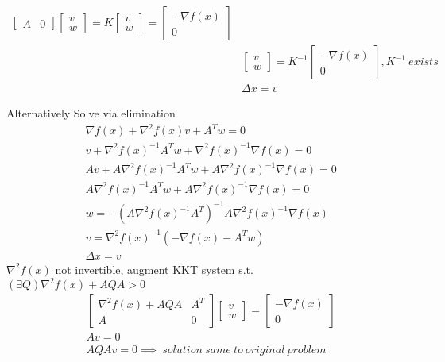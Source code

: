 \message{ !name(notebook.tex)}\documentclass[8pt]{report}
\begin{document}
\begin{multicols*}{2}
\begin{align*}
\begin{bmatrix}
        A & 0 
      \end{bmatrix}
      \begin{bmatrix}
        v\\ w
      \end{bmatrix}=
            K
      \begin{bmatrix}
        v\\ w
      \end{bmatrix} =
    \begin{bmatrix}
        -\nabla f(x)\\
        0
      \end{bmatrix}\\
    &\begin{bmatrix}
        v\\ w
      \end{bmatrix} = K^{-1}
      \begin{bmatrix}
        -\nabla f(x)\\
        0
      \end{bmatrix}, K^{-1}\ exists\\
    &\Delta x = v
  \end{align*}
  
  Alternatively Solve via elimination
  \begin{align*}
    &\nabla f(x) + \nabla^2 f(x) v + A^T w = 0\\
    &v + \nabla^2 f(x)^{-1} A^T w + \nabla^2 f(x)^{-1} \nabla f(x)=0\\
    &Av + A \nabla^2 f(x)^{-1} A^T w + A \nabla^2 f(x)^{-1} \nabla f(x)=0\\
    &A \nabla^2 f(x)^{-1} A^T w + A \nabla^2 f(x)^{-1} \nabla f(x)=0\\
    &w = - (A \nabla^2 f(x)^{-1} A^T)^{-1} A \nabla^2 f(x)^{-1} \nabla f(x)\\
    &v = \nabla^2 f(x)^{-1} (-\nabla f(x) - A^T w)\\
    &\Delta x = v
  \end{align*}
  $\nabla^2 f(x)$ not invertible, augment KKT system s.t.\\
  $(\exists Q) \nabla^2 f(x) + AQA > 0$
  \begin{align*}
    &\begin{bmatrix}
      \nabla^2 f(x) + AQA & A^T \\
      A & 0 
    \end{bmatrix}
    \begin{bmatrix}
      v\\ w
    \end{bmatrix} =
    \begin{bmatrix}
      -\nabla f(x)\\
      0
    \end{bmatrix}\\
    &Av=0\\
    &AQAv = 0 \implies\ solution\ same\ to\ original\ problem
  \end{align*}
  

\end{multicols*}
\end{document}
